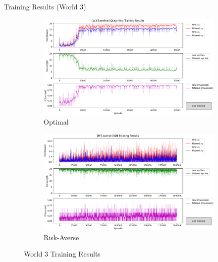 \documentclass[aspectratio=1610, xcolor=dvipsnames]{packages/beamer}
\begin{document}
\begin{frame}{Training Results (World 3)}
     \begin{figure}
     \centering
          \begin{subfigure}[b]{\Wfig\textwidth}  \centering
              \includegraphics[width=\textwidth]{../results/IDQN_W3/Fig_W3_JointQ_Baseline.png}
              \caption{Optimal} \label{fig:W3baseline}
          \end{subfigure}
          \hfill
         \begin{subfigure}[b]{\Wfig\textwidth} \centering
             \includegraphics[width=\textwidth]{../results/IDQN_W3/Fig_W3_JointQ_Averse}
             \caption{Risk-Averse} \label{fig:W3averse}
         \end{subfigure}
    \caption{World 3 Training Results}
    \label{fig:W3}
    \end{figure}
\end{frame}
\end{document}
